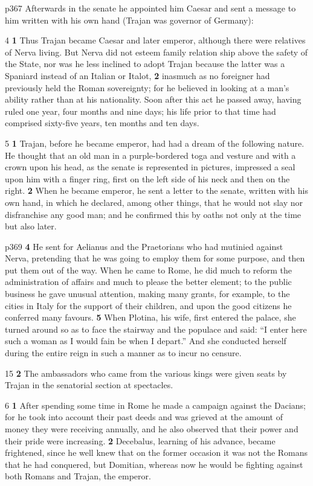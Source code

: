 p367
Afterwards in the senate he appointed him Caesar and sent a message to him written with his own hand (Trajan was governor of Germany):

4 \textbf{1} Thus Trajan became Caesar and later emperor, although there were relatives of Nerva living. But Nerva did not esteem family relation ­ship above the safety of the State, nor was he less inclined to adopt Trajan because the latter was a Spaniard instead of an Italian or Italot, \textbf{2} inasmuch as no foreigner had previously held the Roman sovereignty; for he believed in looking at a man's ability rather than at his nationality. Soon after this act he passed away, having ruled one year, four months and nine days; his life prior to that time had comprised sixty-five years, ten months and ten days.

5 \textbf{1} Trajan, before he became emperor, had had a dream of the following nature. He thought that an old man in a purple-bordered toga and vesture and with a crown upon his head, as the senate is represented in pictures, impressed a seal upon him with a finger ring, first on the left side of his neck and then on the right. \textbf{2} When he became emperor, he sent a letter to the senate, written with his own hand, in which he declared, among other things, that he would not slay nor disfranchise any good man; and he confirmed this by oaths not only at the time but also later.

p369
\textbf{4} He sent for Aelianus and the Praetorians who had mutinied against Nerva, pretending that he was going to employ them for some purpose, and then put them out of the way. When he came to Rome, he did much to reform the administration of affairs and much to please the better element; to the public business he gave unusual attention, making many grants, for example, to the cities in Italy for the support of their children, and upon the good citizens he conferred many favours. \textbf{5} When Plotina, his wife, first entered the palace, she turned around so as to face the stairway and the populace and said: ``I enter here such a woman as I would fain be when I depart.'' And she conducted herself during the entire reign in such a manner as to incur no censure.

15
\textbf{2} The ambassadors who came from the various kings were given seats by Trajan in the senatorial section at spectacles.

6 \textbf{1} After spending some time in Rome he made a campaign against the Dacians; for he took into account their past deeds and was grieved at the amount of money they were receiving annually, and he also observed that their power and their pride were increasing. \textbf{2} Decebalus, learning of his advance, became frightened, since he well knew that on the former occasion it was not the Romans that he had conquered, but Domitian, whereas now he would be fighting against both Romans and Trajan, the emperor.

